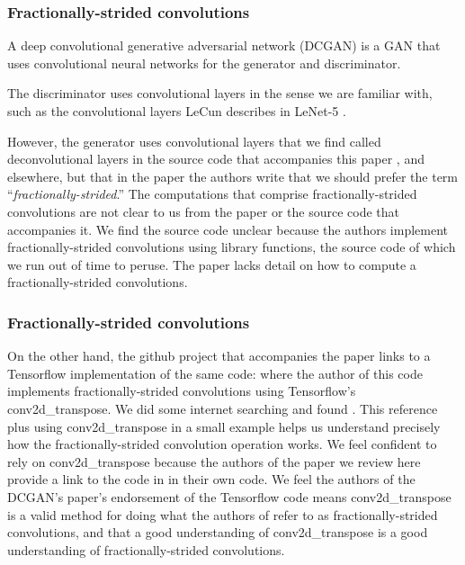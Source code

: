 \documentclass{beamer}
\begin{document}


\begin{frame}
\frametitle{Fractionally-strided convolutions}
A deep convolutional generative adversarial network (DCGAN) is a GAN that uses
convolutional neural networks for the generator and discriminator.

The discriminator uses convolutional layers in the sense we are familiar with, such
as the convolutional layers LeCun describes in LeNet-5 \cite{lenet5}.

However, the generator uses convolutional layers that we find called deconvolutional
layers in the source code that accompanies this paper \cite{dcganCode}, and elsewhere,
but that in the paper the authors write that we should prefer the term ``\textit{fractionally-strided}.''  The computations that comprise fractionally-strided convolutions
are not clear to us from the paper or the source code that accompanies it.  We find
the source code unclear because the authors implement fractionally-strided 
convolutions using library functions, the source code of which we run out of time
to peruse.  The paper lacks detail on how to compute a fractionally-strided 
convolutions.
\end{frame}


\begin{frame}
\frametitle{Fractionally-strided convolutions}
On the other hand, the github project \cite{dcganCode} that accompanies the paper
\cite{repLearnDcgan} links to a Tensorflow implementation of the same code:
\cite{dcganTf} where the author of this code implements fractionally-strided 
convolutions using Tensorflow's conv2d\_transpose.  We did some internet searching
and found \cite{convArith}.   This reference plus using conv2d\_transpose in a
small example helps us understand precisely how the fractionally-strided convolution
operation works.  We feel confident to rely on conv2d\_transpose because the 
authors of the paper \cite{repLearnDcgan} we review here provide a link to the
code in \cite{dcganTf} in their own code. We feel the authors of the DCGAN's paper's
endorsement of the Tensorflow code means conv2d\_transpose is a valid method for
doing what the authors of \cite{repLearnDcgan} refer to as fractionally-strided
convolutions, and that a good understanding of conv2d\_transpose is a good
understanding of fractionally-strided convolutions.

\end{frame}
\end{document}

